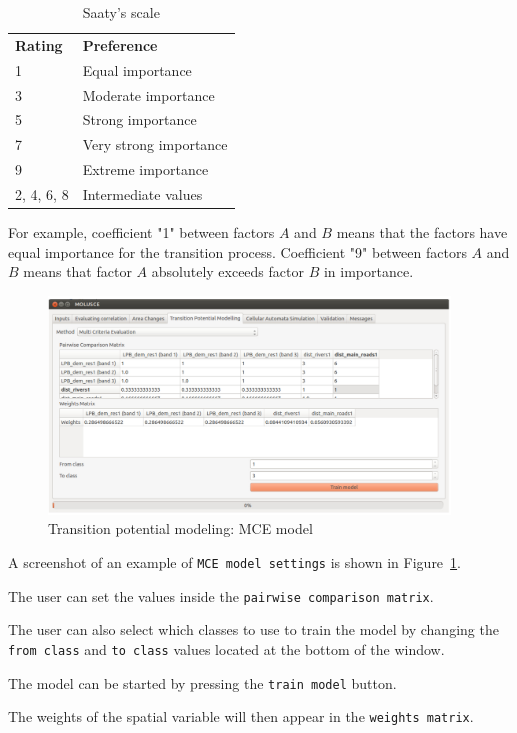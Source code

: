 \documentclass{report}
\begin{document}
\begin{table}
\centering
\caption{Saaty's scale}
\begin{tabular}{ll}
 \bf{Rating} & \bf{Preference}   \\
 1 & Equal importance  \\
 3 & Moderate importance \\ 
 5 & Strong importance \\
 7 & Very strong importance \\
 9 & Extreme importance \\
 2, 4, 6, 8 & Intermediate values 
\end{tabular}
\label{tab:saaty_scale}
\end{table}

For example, coefficient "1" between factors $A$ and $B$ means that the factors have equal importance for the transition process. 
Coefficient "9" between factors $A$ and $B$ means that factor $A$ absolutely exceeds factor $B$ in importance.

\begin{figure}[h!]
\centering
\includegraphics[width=0.95\textwidth]{img/mce_model.png}
\caption{Transition potential modeling: MCE model}
\label{fig:mce_model}
\end{figure}

A screenshot of an example of \verb+MCE model settings+ is shown in Figure~\ref{fig:mce_model}.

The user can set the values inside the \verb+pairwise comparison matrix+. 

The user can also select which classes to use to train the model by changing the \verb+from class+ 
and \verb+to class+ values located at the bottom of the window.


The model can be started by pressing the \verb+train model+ button.

The weights of the spatial variable will then appear in the \verb+weights matrix+.
\end{document}
